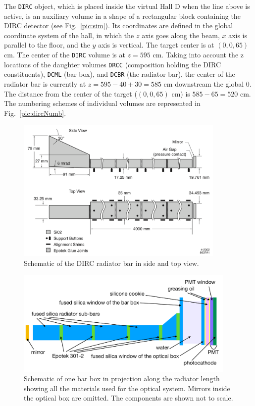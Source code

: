 The \texttt{DIRC} object, which is placed inside the virtual Hall D when the line above is active, is an auxiliary volume in a shape of a rectangular block containing the DIRC detector (see Fig.~\ref{pic:sim}). Its coordinates are defined in the global coordinate system of the hall, in which the $z$ axis goes along the beam, $x$ axis is parallel to the floor, and the $y$ axis is vertical. The target center is at $(0, 0, 65)$ cm. The center of the \texttt{DIRC} volume is at $z = 595$ cm.
Taking into account the z locations of the daughter volumes \texttt{DRCC} (composition holding the DIRC constituents), \texttt{DCML} (bar box), and \texttt{DCBR} (the radiator bar), the center of the radiator bar is currently at $z = 595 - 40 + 30 =585$ cm downstream the global 0. The distance from the center of the target ($(0, 0, 65)$ cm) is $585 - 65 = 520$ cm. The numbering schemes of individual volumes are represented in Fig.~\ref{pic:dircNumb}.

\begin{figure}[!htb]
\centering
\includegraphics[width=0.9\textwidth]{pics/bars.png}
\caption{\label{pic:bar}
Schematic of the DIRC radiator bar in side and top view.
}
\end{figure} 

\begin{figure}[!h]
\centering
\includegraphics[angle=0,width=0.95\textwidth]{pics/struct3.pdf}
\caption{\label{pic:struct}
Schematic of one bar box in projection along the radiator length showing all the materials used for the optical system. Mirrors inside the optical box are omitted. The components are shown not to scale.
}
\end{figure}

